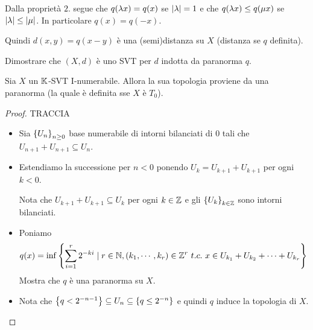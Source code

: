 \begin{remark}
Dalla propriet\`a $2.$ segue che $q(\lambda x)=q(x)$ se $\left|{\lambda}\right|=1$ e che $q(\lambda x)\leq q(\mu x)$ se $\left|{\lambda}\right|\leq\left|{\mu}\right|$. In particolare $q(x)=q(-x)$.

Quindi $d(x,y)=q(x-y)$ \`e una (semi)distanza su $X$ (distanza se $q$ definita).
\end{remark}

\begin{exercise}
Dimostrare che $(X,d)$ \`e uno SVT per $d$ indotta da paranorma $q$.
\end{exercise}

\begin{exercise}\label{SVTINumerabileVieneDaParanorma}
Sia $X$ un $\mathbb{K}$-SVT I-numerabile. Allora la sua topologia proviene da una paranorma (la quale \`e definita sse $X$ \`e $T_0$).
\end{exercise}
\begin{proof}
TRACCIA
\begin{itemize}
    \item Sia $\left\{{U_n}\right\}_{n\geq 0}$ base numerabile di intorni bilanciati di $0$ tali che $U_{n+1}+U_{n+1}\subseteq U_n$.
    \item Estendiamo la successione per $n<0$ ponendo $U_k=U_{k+1}+U_{k+1}$ per ogni $k<0$.
    
    Nota che $U_{k+1}+U_{k+1}\subseteq U_k$ per ogni $k\in \mathbb{Z}$ e gli $\left\{{U_k}\right\}_{k\in\mathbb{Z}}$ sono intorni bilanciati. 
    \item Poniamo
    \[q(x)=\inf\left\{{\sum_{i=1}^r2^{-ki}\mid r\in\mathbb{N},(k_1,\cdots, k_r)\in\mathbb{Z}^r\ t.c.\ x\in U_{k_1}+U_{k_2}+\cdots+U_{k_r}}\right\}\]
    Mostra che $q$ \`e una paranorma su $X$.
    \item Nota che $\left\{{q<2^{-n-1}}\right\}\subseteq U_n\subseteq \left\{{q\leq 2^{-n}}\right\}$ e quindi $q$ induce la topologia di $X$.
\end{itemize}
\end{proof}


